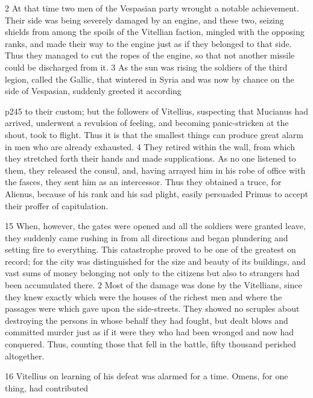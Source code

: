 2
At that time two men of the Vespasian party wrought a notable achievement. Their side was being severely damaged by an engine, and these two, seizing shields from among the spoils of the Vitellian faction, mingled with the opposing ranks, and made their way to the engine just as if they belonged to that side. Thus they managed to cut the ropes of the engine, so that not another missile could be discharged from it. 3 As the sun was rising the soldiers of the third legion, called the Gallic, that wintered in Syria and was now by chance on the side of Vespasian, suddenly greeted it according

p245 to their custom; but the followers of Vitellius, suspecting that Mucianus had arrived, underwent a revulsion of feeling, and becoming panic-stricken at the shout, took to flight. Thus it is that the smallest things can produce great alarm in men who are already exhausted. 4 They retired within the wall, from which they stretched forth their hands and made supplications. As no one listened to them, they released the consul, and, having arrayed him in his robe of office with the fasces, they sent him as an intercessor. Thus they obtained a truce, for Alienus, because of his rank and his sad plight, easily persuaded Primus to accept their proffer of capitulation.

15
When, however, the gates were opened and all the soldiers were granted leave, they suddenly came rushing in from all directions and began plundering and setting fire to everything. This catastrophe proved to be one of the greatest on record; for the city was distinguished for the size and beauty of its buildings, and vast sums of money belonging not only to the citizens but also to strangers had been accumulated there. 2 Most of the damage was done by the Vitellians, since they knew exactly which were the houses of the richest men and where the passages were which gave upon the side-streets. They showed no scruples about destroying the persons in whose behalf they had fought, but dealt blows and committed murder just as if it were they who had been wronged and now had conquered. Thus, counting those that fell in the battle, fifty thousand perished altogether.

16
Vitellius on learning of his defeat was alarmed for a time. Omens, for one thing, had contributed

